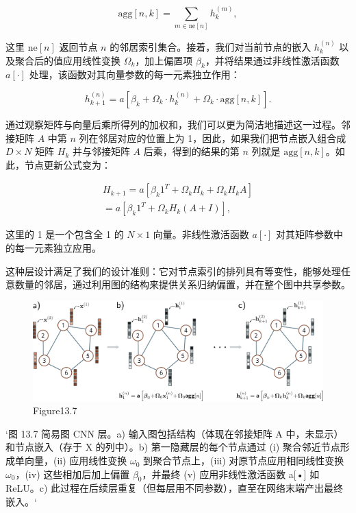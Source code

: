 \begin{equation}
\text{agg}[n, k] = \sum_{m \in \text{ne}[n]} h_k^{(m)}, 
\end{equation}

这里 \(\text{ne}[n]\) 返回节点 \(n\) 的邻居索引集合。接着，我们对当前节点的嵌入 \(h_k^{(n)}\) 以及聚合后的值应用线性变换 \(\Omega_k\)，加上偏置项 \(\beta_k\)，并将结果通过非线性激活函数 \(a[\cdot]\) 处理，该函数对其向量参数的每一元素独立作用：

\begin{equation}
h_{k+1}^{(n)} = a \left[ \beta_k + \Omega_k \cdot h_k^{(n)} + \Omega_k \cdot \text{agg}[n, k] \right]. 
\end{equation}

通过观察矩阵与向量后乘所得列的加权和，我们可以更为简洁地描述这一过程。邻接矩阵 \(A\) 中第 \(n\) 列在邻居对应的位置上为 1，因此，如果我们把节点嵌入组合成 \(D \times N\) 矩阵 \(H_k\) 并与邻接矩阵 \(A\) 后乘，得到的结果的第 \(n\) 列就是 \(\text{agg}[n, k]\)。如此，节点更新公式变为：


\begin{align}
H_{k+1} = a [\beta_{k} 1^T + \Omega_k H_k + \Omega_k H_k A] \\
= a [\beta_{k} 1^T + \Omega_k H_k (A + I)], 
\end{align} 


这里的 1 是一个包含全 1 的 \(N \times 1\) 向量。非线性激活函数 \(a[\cdot]\) 对其矩阵参数中的每一元素独立应用。

这种层设计满足了我们的设计准则：它对节点索引的排列具有等变性，能够处理任意数量的邻居，通过利用图的结构来提供关系归纳偏置，并在整个图中共享参数。

\begin{figure}[ht!]
\centering
\includegraphics[width=0.7\linewidth]{png/chapter13/GraphGCN.png}
\caption{Figure13.7}
\end{figure}

`图 13.7 简易图 CNN 层。a) 输入图包括结构（体现在邻接矩阵 A 中，未显示）和节点嵌入（存于 X 的列中）。b) 第一隐藏层的每个节点通过 (i) 聚合邻近节点形成单向量，(ii) 应用线性变换 \(\omega_0\) 到聚合节点上，(iii) 对原节点应用相同线性变换 \(\omega_0\)，(iv) 这些相加后加上偏置 \(\beta_0\)，并最终 (v) 应用非线性激活函数 a[•] 如 ReLU。c) 此过程在后续层重复（但每层用不同参数），直至在网络末端产出最终嵌入。`

